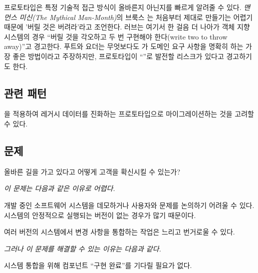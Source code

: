 \documentclass[a4paper,10pt,twoside]{book}
\begin{document}
프로토타입은 특정 기술적 접근 방식이 올바른지 아닌지를 빠르게 알려줄 수 있다. \emph{맨먼스 미신(The Mythical Man-Month)}의 브룩스 \cite{Broo75a}는 처음부터 제대로 만들기는 어렵기 때문에 '버릴 것은 버려라'라고 조언한다.
러브는 여기서 한 걸음 더 나아가 객체 지향 시스템의 경우 ``버릴 것을 각오하고 두 번 구현해야 한다(write two to throw away)''고 경고한다\cite{Love93a}. 푸트와 요더는 무엇보다도 가 도메인 요구 사항을 명확히 하는 가장 좋은 방법이라고 주장하지만, 프로토타입이 ``''로 발전할 리스크가 있다고 경고하기도 한다\cite{Foot00a}.

\subsection*{관련 패턴}

을 적용하여 레거시 데이터를 진화하는 프로토타입으로 마이그레이션하는 것을 고려할 수 있다.




\subsection*{문제}

올바른 길을 가고 있다고 어떻게 고객을 확신시킬 수 있는가?

\emph{이 문제는 다음과 같은 이유로 어렵다.}

\begin{bulletlist}
\item 개발 중인 소프트웨어 시스템을 데모하거나 사용자와 문제를 논의하기 어려울 수 있다. 시스템의 안정적으로 실행되는 버전이 없는 경우가 많기 때문이다.

\item 여러 버전의 시스템에서 변경 사항을 통합하는 작업은 느리고 번거로울 수 있다.
\end{bulletlist}

\emph{그러나 이 문제를 해결할 수 있는 이유는 다음과 같다.}

\begin{bulletlist}
\item 시스템 통합을 위해 컴포넌트 ``구현 완료''를 기다릴 필요가 없다.
\end{bulletlist}
\end{document}
